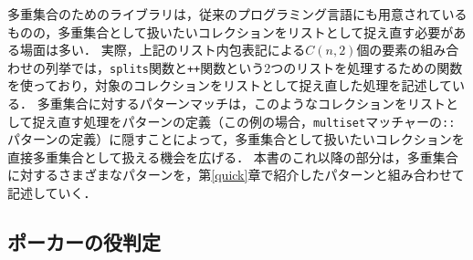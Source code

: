 多重集合のためのライブラリは，従来のプログラミング言語にも用意されているものの，多重集合として扱いたいコレクションをリストとして捉え直す必要がある場面は多い．
実際，上記のリスト内包表記による$C(n,2)$個の要素の組み合わせの列挙では，\lstinline{splits}関数と\lstinline{++}関数という2つのリストを処理するための関数を使っており，対象のコレクションをリストとして捉え直した処理を記述している．
多重集合に対するパターンマッチは，このようなコレクションをリストとして捉え直す処理をパターンの定義（この例の場合，\lstinline{multiset}マッチャーの\lstinline{::}パターンの定義）に隠すことによって，多重集合として扱いたいコレクションを直接多重集合として扱える機会を広げる．
本書のこれ以降の部分は，多重集合に対するさまざまなパターンを，第\ref{quick}章で紹介したパターンと組み合わせて記述していく．


\subsection{ポーカーの役判定}\label{pmo-poker}

